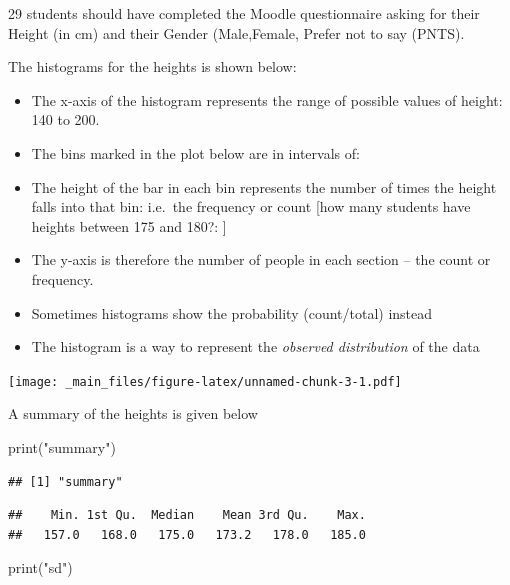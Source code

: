 \documentclass[
]{gitbook}
\newenvironment{Shaded}{\begin{snugshade}}{\end{snugshade}}
\newcommand{\FunctionTok}[1]{\textcolor[rgb]{0.00,0.00,0.00}{#1}}
\newcommand{\NormalTok}[1]{#1}
\newcommand{\SpecialCharTok}[1]{\textcolor[rgb]{0.00,0.00,0.00}{#1}}
\newcommand{\StringTok}[1]{\textcolor[rgb]{0.31,0.60,0.02}{#1}}
\providecommand{\tightlist}{%
  \setlength{\itemsep}{0pt}\setlength{\parskip}{0pt}}
\begin{document}
29 students should have completed the Moodle questionnaire asking for their Height (in cm) and their Gender (Male,Female, Prefer not to say (PNTS).

The histograms for the heights is shown below:

\begin{itemize}
\tightlist
\item
  The x-axis of the histogram represents the range of possible values of height: 140 to 200.
\item
  The bins marked in the plot below are in intervals of:
\item
  The height of the bar in each bin represents the number of times the height falls into that bin: i.e.~the frequency or count {[}how many students have heights between 175 and 180?: {]}
\item
  The y-axis is therefore the number of people in each section -- the count or frequency.
\item
  Sometimes histograms show the probability (count/total) instead
\item
  The histogram is a way to represent the \emph{observed distribution} of the data
\end{itemize}

\texttt{[image: \_main\_files/figure-latex/unnamed-chunk-3-1.pdf]}

A summary of the heights is given below

\begin{Shaded}
\begin{Highlighting}[]
\FunctionTok{print}\NormalTok{(}\StringTok{"summary"}\NormalTok{)}
\end{Highlighting}
\end{Shaded}

\begin{verbatim}
## [1] "summary"
\end{verbatim}

\begin{Shaded}
\end{Shaded}

\begin{verbatim}
##    Min. 1st Qu.  Median    Mean 3rd Qu.    Max. 
##   157.0   168.0   175.0   173.2   178.0   185.0
\end{verbatim}

\begin{Shaded}
\begin{Highlighting}[]
\FunctionTok{print}\NormalTok{(}\StringTok{"sd"}\NormalTok{)}
\end{Highlighting}
\end{Shaded}
\end{document}

